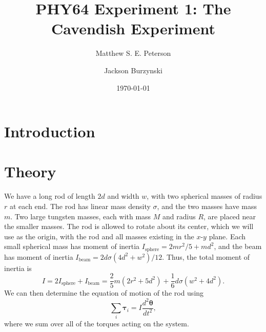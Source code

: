 \documentclass[aps, reprint,amsmath,amssymb]{revtex4-1} %
\renewcommand{\vec}[1]{\boldsymbol{#1}}
\begin{document}
\title{PHY64 Experiment 1: The Cavendish Experiment}
\author{Matthew S. E. Peterson}
\author{Jackson Burzynski}
\date{\today} 
\maketitle

\section{Introduction}

\section{Theory}

We have a long rod of length $2d$ and width $w$, with two spherical masses
of radius $r$ at each end.  The rod has linear mass density $\sigma$, and
the two masses have mass $m$. Two large tungsten masses, each with mass $M$
and radius $R$, are placed near the smaller masses. The rod is allowed
to rotate about its center, which we will use as the origin, with the rod
and all masses existing in the $x$-$y$ plane. Each small spherical mass has
moment of inertia $I_\text{sphere} = 2mr^2/5 + md^2$, and the beam has
moment of inertia $I_\text{beam} = 2d\sigma(4d^2 + w^2)/12$. Thus, the
total moment of inertia is
\begin{equation}
    \label{eq:moment_of_inertia}
    I = 2I_\text{sphere} + I_\text{beam} 
    = \frac{2}{5} m (2 r^2 + 5 d^2) + \frac{1}{6}d\sigma(w^2 + 4d^2).
\end{equation}
We can then determine the equation of motion of the rod using
\begin{equation}
    \sum_i \vec{\tau}_i = I \frac{d^2\vec{\theta}}{dt^2},
\end{equation}
where we sum over all of the torques acting on the system. 
\end{document}

